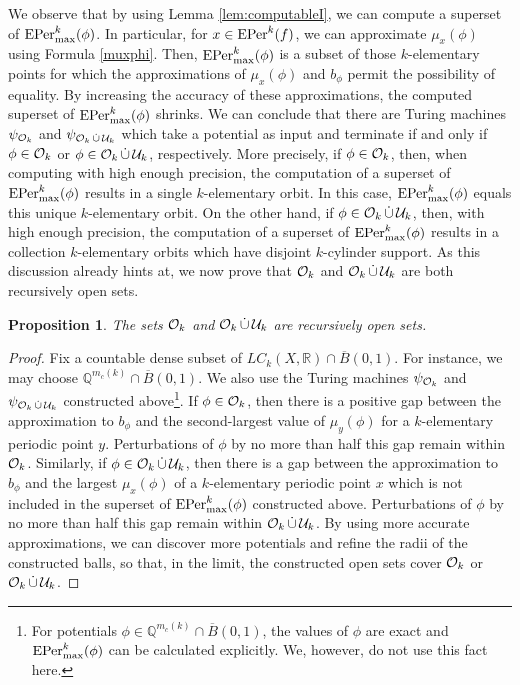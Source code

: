 \documentclass[11pt, reqno]{amsart}
\newtheorem{proposition}[theorem]{Proposition}
\newcommand{\EPer}{{\rm EPer}}
\newcommand{\bR}{{\mathbb R}}
\newcommand{\bQ}{{\mathbb Q}}
\newcommand{\cU}{{\mathcal U}}
\def\EPer{{\rm EPer}}
\begin{document}
We observe that by using Lemma \ref{lem:computableI}, we can compute a superset of $\EPer_{\max}^k(\phi)$.  In particular, for $x\in\EPer^k(f)$, we can approximate $\mu_x(\phi)$ using  Formula \eqref{muxphi}.  Then, $\EPer_{\max}^k(\phi)$ is a subset of those $k$-elementary points for which the approximations of $\mu_x(\phi)$ and $b_\phi$ permit the possibility of equality.  By increasing the accuracy of these approximations, the computed superset of $\EPer_{\max}^k(\phi)$ shrinks.  We can conclude that there are Turing machines $\psi_{\mathcal O_k}$ and $\psi_{\cO_k\,\dot\cup\,\cU_k}$ which take a potential as input and terminate if and only if $\phi\in\mathcal O_k$ or $\phi\in\cO_k\,\dot\cup\,\cU_k$, respectively.  More precisely, if $\phi\in\mathcal O_k$, then, when computing with high enough precision, the computation of a superset of $\EPer_{\max}^k(\phi)$ results in a single $k$-elementary orbit.  In this case, $\EPer_{\max}^k(\phi)$ equals this unique $k$-elementary orbit.  On the other hand, if $\phi\in\cO_k\,\dot\cup\,\cU_k$, then, with high enough precision, the computation of a superset of $\EPer_{\max}^k(\phi)$ results in a collection $k$-elementary orbits which have disjoint $k$-cylinder support.  As this discussion already hints at, we now prove that $\mathcal O_k$ and $\cO_k\,\dot\cup\,\cU_k$ are both recursively open sets.
\begin{proposition}\label{prop:recursivelyopen}
The sets $\mathcal O_k$ and $\cO_k\,\dot\cup\,\cU_k$ are recursively open sets.
\end{proposition}
\begin{proof}
Fix a countable dense subset of $LC_k(X,\bR)\cap\overline{B}(0,1)$.  For instance, we may choose $\bQ^{m_c(k)}\cap\overline{B}(0,1)$.  We also use the Turing machines $\psi_{\mathcal O_k}$ and $\psi_{\cO_k\,\dot\cup\,\cU_k}$ constructed above\footnote{For potentials $\phi\in\bQ^{m_c(k)}\cap\overline{B}(0,1)$, the values of $\phi$ are exact and $\EPer_{\max}^k(\phi)$ can be calculated explicitly.  We, however, do not use this fact here.}.  If $\phi\in\mathcal O_k$, then there is a positive gap between the approximation to $b_\phi$ and the second-largest value of $\mu_y(\phi)$ for a $k$-elementary periodic point $y$.  Perturbations of $\phi$ by no more than half this gap remain within $\mathcal O_k$.  Similarly, if $\phi\in\cO_k\,\dot\cup\,\cU_k$, then there is a gap between the approximation to $b_\phi$ and the largest $\mu_x(\phi)$ of a $k$-elementary periodic point $x$ which is not included in the superset of $\EPer_{\max}^k(\phi)$ constructed above.  Perturbations of $\phi$ by no more than half this gap remain within $\cO_k\,\dot\cup\,\cU_k$.  By using more accurate approximations, we can discover more potentials and refine the radii of the constructed balls, so that, in the limit, the constructed open sets  cover $\mathcal O_k$ or $\cO_k\,\dot\cup\,\cU_k$.  
\end{proof}
\end{document}
